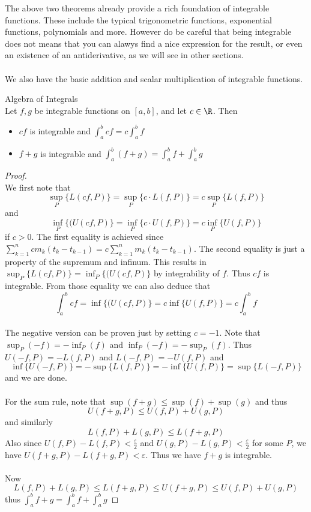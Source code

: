 \documentclass[a4paper]{article}
\begin{document}
The above two theorems already provide a rich foundation of integrable functions. These include the typical trigonometric functions, exponential functions, polynomials and more. However do be careful that being integrable does not means that you can alawys find a nice expression for the result, or even an existence of an antiderivative, as we will see in other sections. \\~\\
We also have the basic addition and scalar multiplication of integrable functions. 

\begin{thm}{Algebra of Integrals}{}\\ Let $f,g$ be integrable functions on $[a,b]$, and let $c\in\R$. Then
\begin{itemize}
\item $cf$ is integrable and $\int_{a}^{b}cf=c\int_{a}^{b}f$
\item $f+g$ is integrable and $\int_{a}^{b}(f+g)=\int_{a}^{b}f+\int_{a}^{b}g$
\end{itemize}
\begin{proof}\\ We first note that $$\sup_P\{L(cf,P)\}=\sup_P\{c\cdot L(f,P)\}=c\sup_P\{L(f,P)\}$$ and $$\inf_P\{(U(cf,P)\}=\inf_P\{c\cdot U(f,P)\}=c\inf_P\{U(f,P)\}$$ if $c>0$. The first equality is achieved since $\sum_{k=1}^ncm_k(t_k-t_{k-1})=c\sum_{k=1}^nm_k(t_k-t_{k-1})$. The second equality is just a property of the supremum and infinum. This results in $\sup_P\{L(cf,P)\}=\inf_P\{(U(cf,P)\}$ by integrability of $f$. Thus $cf$ is integrable. From those equality we can also deduce that $$\int_a^bcf=\inf\{(U(cf,P)\}=c\inf\{U(f,P)\}=c\int_a^bf$$
\\
The negative version can be proven just by setting $c=-1$. Note that $\sup_P(-f)=-\inf_P(f)$ and $\inf_P(-f)=-\sup_P(f)$. Thus $U(-f,P)=-L(f,P)$ and $L(-f,P)=-U(f,P)$ and $$\inf\{U(-f,P)\}=-\sup\{L(f,P)\}=-\inf\{U(f,P)\}=\sup\{L(-f,P)\}$$ and we are done. \\~\\
For the sum rule, note that $\sup(f+g)\leq\sup(f)+\sup(g)$ and thus $$U(f+g,P)\leq U(f,P)+U(g,P)$$ and similarly $$L(f,P)+L(g,P)\leq L(f+g,P)$$ Also since $U(f,P)-L(f,P)<\frac{\varepsilon}{2}$ and $U(g,P)-L(g,P)<\frac{\varepsilon}{2}$ for some $P$, we have $U(f+g,P)-L(f+g,P)<\varepsilon$. Thus we have $f+g$ is integrable. \\~\\
Now $$L(f,P)+L(g,P)\leq L(f+g,P)\leq U(f+g,P)\leq U(f,P)+U(g,P)$$ thus $\int_a^bf+g=\int_a^bf+\int_a^bg$
\end{proof}
\end{thm}
\end{document}
